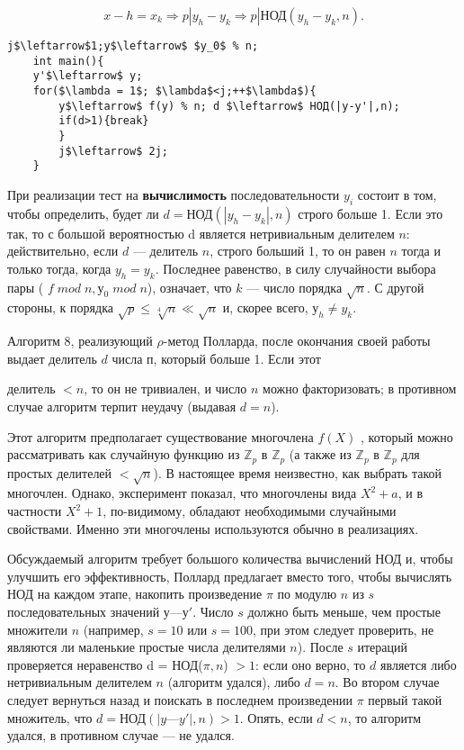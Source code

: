 \documentclass{mai_book}
\begin{document}
	\begin{equation}
		x-h=x_k  \Rightarrow p|y_h-y_k \Rightarrow p|\text{НОД}(y_h-y_k,n).
	\end{equation}

	
	\begin{lstlisting}[mathescape=true,caption=Неоптимизированный $\rho$-метод Полларда]
	j$\leftarrow$1;y$\leftarrow$ $y_0$ % n;
	int main(){
	y'$\leftarrow$ y;
	for($\lambda = 1$; $\lambda$<j;++$\lambda$){
		y$\leftarrow$ f(y) % n; d $\leftarrow$ НОД(|y-y'|,n);
		if(d>1){break}
		}
		j$\leftarrow$ 2j;
	}
	\end{lstlisting}
	
	При реализации тест на {\bf вычислимость} последовательности $y_i$ состоит в том, чтобы определить, будет ли $d = \text{НОД}(|y_h -y_k|, n)$ строго	больше 1. Если это так, то с большой вероятностью d является нетривиальным делителем $n$: действительно, если $d$ — делитель $n$, строго
	больший 1, то он равен $n$ тогда и только тогда, когда $y_h=y_k$. Последнее равенство, в силу случайности выбора пары ( $f\;mod\;n, у_0\;mod\;n$), означает, что $k$ — число порядка $\sqrt{n}$. С другой стороны, $к$ порядка
	$\sqrt{p}\leqslant \sqrt[4]{n} \ll \sqrt{n}$ и, скорее всего, $у_h \neq y_k$.
	
	Алгоритм 8, реализующий $\rho$-метод Полларда, после окончания своей работы выдает делитель $d$ числа $п$, который больше 1. Если этот
	
	\pagebreak
	\noindent
	делитель $< n$, то он не тривиален, и число $n$ можно факторизовать; в противном случае алгоритм терпит неудачу (выдавая $d = n$). 
	
	Этот алгоритм предполагает существование многочлена $f(X)$ , который можно рассматривать как случайную функцию из $\mathbb Z_p$ в $\mathbb Z_p$ (а так­же из $\mathbb Z_p$ в  $\mathbb Z_p$ для простых делителей $< \sqrt{n}$). В настоящее время не­известно, как выбрать такой многочлен. Однако, эксперимент показал, что многочлены вида $X^2+a$, и в частности $X^2+ 1$, по-видимому, обла­дают необходимыми случайными свойствами. Именно эти многочлены	используются обычно в реализациях.
	
	Обсуждаемый алгоритм требует большого количества вычислений	НОД и, чтобы улучшить его эффективность, Поллард предлагает вместо того, чтобы вычислять НОД на каждом этапе, накопить произве­дение $\pi$ по модулю $n$ из $s$ последовательных значений $у — у'$. Число $s$	должно быть меньше, чем простые множители $n$ (например, $s = 10$ или $s = 100$, при этом следует проверить, не являются ли маленькие простые	числа делителями $n$). После $s$ итераций проверяется неравенство d =	НОД($\pi,n$)
	\noindent
	$> 1$: если оно верно, то $d$ является либо нетривиальным делителем $n$ (алгоритм удался), либо $d = n$. Во втором случае следует вернуться на­зад и поискать в последнем произведении $\pi$ первый такой множитель,	что $d = \text{НОД}(|y — y'|, n) > 1$. Опять, если $d < n$, то алгоритм удался, в	противном случае — не удался.
	
\end{document}
